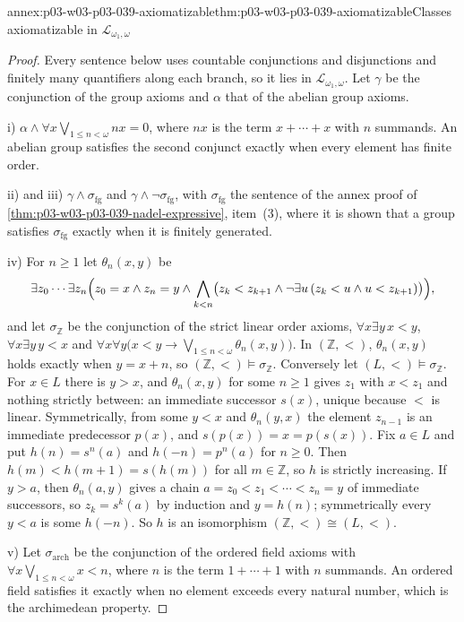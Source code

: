 \begin{annexitem}{annex:p03-w03-p03-039-axiomatizable}{thm:p03-w03-p03-039-axiomatizable}{Classes axiomatizable in \(\mathcal L_{\omega_1,\omega}\)}
\begin{proof}
Every sentence below uses countable conjunctions and disjunctions and
finitely many quantifiers along each branch, so it lies in
\(\mathcal L_{\omega_1,\omega}\). Let \(\gamma\) be the conjunction of the
group axioms and \(\alpha\) that of the abelian group axioms.

i) \(\alpha\wedge\forall x\bigvee_{1\le n<\omega}nx=0\), where \(nx\) is the
term \(x+\cdots+x\) with \(n\) summands. An abelian group satisfies the
second conjunct exactly when every element has finite order.

ii) and iii) \(\gamma\wedge\sigma_{\mathrm{fg}}\) and
\(\gamma\wedge\neg\sigma_{\mathrm{fg}}\), with \(\sigma_{\mathrm{fg}}\) the
sentence of the annex proof of \cref{thm:p03-w03-p03-039-nadel-expressive},
item~(3), where it is shown that a group satisfies \(\sigma_{\mathrm{fg}}\)
exactly when it is finitely generated.

iv) For \(n\ge1\) let \(\theta_n(x,y)\) be
\[
\exists z_0\cdots\exists z_n\Bigl(z_0=x\wedge z_n=y\wedge\bigwedge_{k<n}\bigl(z_k<z_{k+1}\wedge\neg\exists u\,(z_k<u\wedge u<z_{k+1})\bigr)\Bigr),
\]
and let \(\sigma_{\mathbb Z}\) be the conjunction of the strict linear order
axioms, \(\forall x\exists y\,x<y\), \(\forall x\exists y\,y<x\) and
\(\forall x\forall y\bigl(x<y\to\bigvee_{1\le n<\omega}\theta_n(x,y)\bigr)\).
In \((\mathbb Z,<)\), \(\theta_n(x,y)\) holds exactly when \(y=x+n\), so
\((\mathbb Z,<)\models\sigma_{\mathbb Z}\). Conversely let
\((L,<)\models\sigma_{\mathbb Z}\). For \(x\in L\) there is \(y>x\), and
\(\theta_n(x,y)\) for some \(n\ge1\) gives \(z_1\) with \(x<z_1\) and nothing
strictly between: an immediate successor \(s(x)\), unique because \(<\) is
linear. Symmetrically, from some \(y<x\) and \(\theta_n(y,x)\) the element
\(z_{n-1}\) is an immediate predecessor \(p(x)\), and \(s(p(x))=x=p(s(x))\).
Fix \(a\in L\) and put \(h(n)=s^n(a)\) and \(h(-n)=p^n(a)\) for \(n\ge0\).
Then \(h(m)<h(m+1)=s(h(m))\) for all \(m\in\mathbb Z\), so \(h\) is strictly
increasing. If \(y>a\), then \(\theta_n(a,y)\) gives a chain
\(a=z_0<z_1<\cdots<z_n=y\) of immediate successors, so \(z_k=s^k(a)\) by
induction and \(y=h(n)\); symmetrically every \(y<a\) is some \(h(-n)\).
So \(h\) is an isomorphism \((\mathbb Z,<)\cong(L,<)\).

v) Let \(\sigma_{\mathrm{arch}}\) be the conjunction of the ordered field axioms
with \(\forall x\bigvee_{1\le n<\omega}x<n\), where \(n\) is the term
\(1+\cdots+1\) with \(n\) summands. An ordered field satisfies it exactly when
no element exceeds every natural number, which is the archimedean property.


\end{proof}
\end{annexitem}
